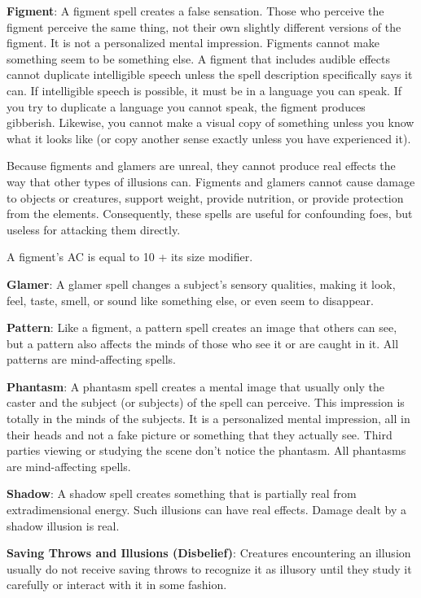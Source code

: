\textbf{Figment}: A figment spell creates a false sensation. Those who perceive the figment perceive the same thing, not their own slightly different versions of the figment. It is not a personalized mental impression. Figments cannot make something seem to be something else. A figment that includes audible effects cannot duplicate intelligible speech unless the spell description specifically says it can. If intelligible speech is possible, it must be in a language you can speak. If you try to duplicate a language you cannot speak, the figment produces gibberish. Likewise, you cannot make a visual copy of something unless you know what it looks like (or copy another sense exactly unless you have experienced it).
				
Because figments and glamers are unreal, they cannot produce real effects the way that other types of illusions can. Figments and glamers cannot cause damage to objects or creatures, support weight, provide nutrition, or provide protection from the elements. Consequently, these spells are useful for confounding foes, but useless for attacking them directly. 
				
A figment's AC is equal to 10 + its size modifier.
				
\textbf{Glamer}: A glamer spell changes a subject's sensory qualities, making it look, feel, taste, smell, or sound like something else, or even seem to disappear.
				
\textbf{Pattern}: Like a figment, a pattern spell creates an image that others can see, but a pattern also affects the minds of those who see it or are caught in it. All patterns are mind-affecting spells.
				
\textbf{Phantasm}: A phantasm spell creates a mental image that usually only the caster and the subject (or subjects) of the spell can perceive. This impression is totally in the minds of the subjects. It is a personalized mental impression, all in their heads and not a fake picture or something that they actually see. Third parties viewing or studying the scene don't notice the phantasm. All phantasms are mind-affecting spells.
				
\textbf{Shadow}: A shadow spell creates something that is partially real from extradimensional energy. Such illusions can have real effects. Damage dealt by a shadow illusion is real.
				
\textbf{Saving Throws and Illusions (Disbelief)}: Creatures encountering an illusion usually do not receive saving throws to recognize it as illusory until they study it carefully or interact with it in some fashion.
				
